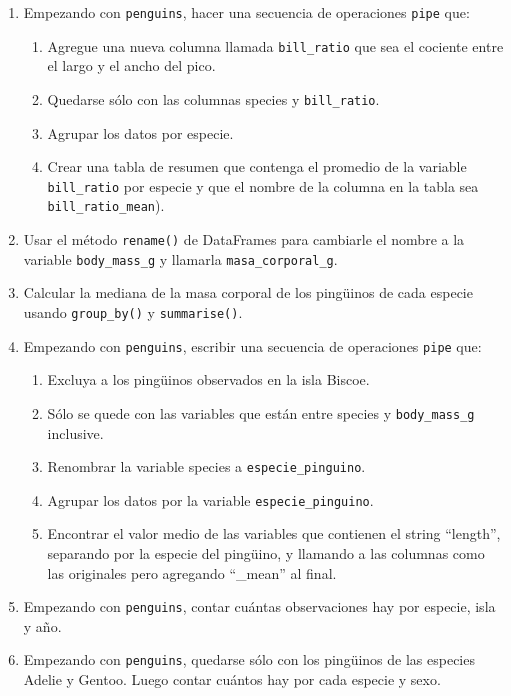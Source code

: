 \documentclass[a4paper,11pt]{article}
\theoremstyle{definition}
\begin{document}
\begin{enumerate}
\item Empezando con \lstinline{penguins}, hacer una secuencia de operaciones \lstinline{pipe} que:
\begin{enumerate}
\item Agregue una nueva columna llamada \lstinline{bill_ratio} que sea el cociente entre el largo y el ancho del pico.
\item Quedarse sólo con las columnas species y \lstinline{bill_ratio}.
\item Agrupar los datos por especie.
\item Crear una tabla de resumen que contenga el promedio de la variable \lstinline{bill_ratio} por especie y que el nombre de la columna en la tabla sea \lstinline{bill_ratio_mean}).
\end{enumerate}

\item Usar el método \lstinline{rename()} de DataFrames para cambiarle el nombre a la variable \lstinline{body_mass_g} y llamarla \lstinline{masa_corporal_g}.

\item Calcular la mediana de la masa corporal de los ping\"uinos de cada especie usando \lstinline{group_by()} y \lstinline{summarise()}.

\item Empezando con \lstinline{penguins}, escribir una secuencia de operaciones \lstinline{pipe} que:
\begin{enumerate}
\item Excluya a los ping\"uinos observados en la isla Biscoe.
\item Sólo se quede con las variables que están entre species y \lstinline{body_mass_g} inclusive.
\item Renombrar la variable species a \lstinline{especie_pinguino}.
\item Agrupar los datos por la variable \lstinline{especie_pinguino}.
\item Encontrar el valor medio de las variables que contienen el string ``length'', separando por la especie del ping\"uino, y llamando a las columnas como las originales pero agregando ``\_mean'' al final.
\end{enumerate}

\item Empezando con \lstinline{penguins}, contar cuántas observaciones hay por especie, isla y año.

\item Empezando con \lstinline{penguins}, quedarse sólo con los ping\"uinos de las especies Adelie y Gentoo. Luego contar cuántos hay por cada especie y sexo.


\end{enumerate}
\end{document}
